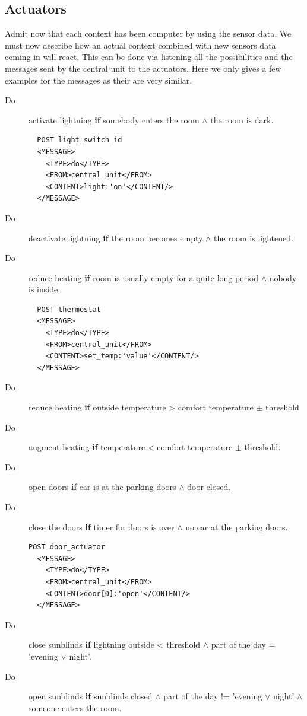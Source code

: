 \documentclass{acm_proc_article-sp}
\begin{document}
\subsection{Actuators}
Admit now that each context has been computer by using the sensor data.
We must now describe how an actual context combined with new sensors data coming in will react. 
This can be done via listening all the possibilities and the messages sent by the central unit to the actuators.
Here we only gives a few examples for the messages as their are very similar.
\begin{description}
 \item[Do] activate lightning \textbf{if} somebody enters the room $\land$ the room is dark.\\
 \begin{verbatim}
  POST light_switch_id 
  <MESSAGE>
    <TYPE>do</TYPE>
    <FROM>central_unit</FROM>
    <CONTENT>light:'on'</CONTENT/>
  </MESSAGE> 
\end{verbatim}
 \item[Do] deactivate lightning \textbf{if} the room becomes empty $\land$ the room is lightened.
 \item[Do] reduce heating \textbf{if} room is usually empty for a quite long period $\land$ nobody is inside.\\
 \begin{verbatim}
  POST thermostat 
  <MESSAGE>
    <TYPE>do</TYPE>
    <FROM>central_unit</FROM>
    <CONTENT>set_temp:'value'</CONTENT/>
  </MESSAGE> 
\end{verbatim}
 \item[Do] reduce heating \textbf{if} outside temperature > comfort temperature $\pm$ threshold
 \item[Do] augment heating \textbf{if} temperature < comfort temperature $\pm$ threshold.
 \item[Do] open doors \textbf{if} car is at the parking doors $\land$ door closed.
 \item[Do] close the doors \textbf{if} timer for doors is over $\land$ no car at the parking doors.\\
 \begin{verbatim}
POST door_actuator
  <MESSAGE>
    <TYPE>do</TYPE>
    <FROM>central_unit</FROM>
    <CONTENT>door[0]:'open'</CONTENT/>
  </MESSAGE> 
\end{verbatim}
 \item[Do] close sunblinds \textbf{if} lightning outside < threshold $\land$ part of the day = ’evening $\lor$ night’.
 \item[Do] open sunblinds \textbf{if} sunblinds closed $\land$ part of the day != ’evening $\lor$ night’ $\land$ someone enters the room.
\end{description}
\end{document}
